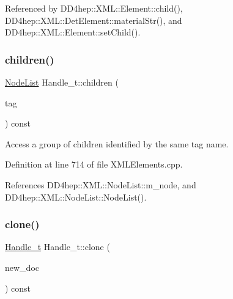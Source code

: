 Referenced by D\+D4hep\+::\+X\+M\+L\+::\+Element\+::child(), D\+D4hep\+::\+X\+M\+L\+::\+Det\+Element\+::material\+Str(), and D\+D4hep\+::\+X\+M\+L\+::\+Element\+::set\+Child().

\hypertarget{class_d_d4hep_1_1_x_m_l_1_1_handle__t_aa27483dcfe272afb4ce560a5e45998f1}{}\label{class_d_d4hep_1_1_x_m_l_1_1_handle__t_aa27483dcfe272afb4ce560a5e45998f1} 
\subsubsection{\texorpdfstring{children()}{children()}}
{\footnotesize\ttfamily \hyperlink{class_d_d4hep_1_1_x_m_l_1_1_node_list}{Node\+List} Handle\+\_\+t\+::children (\begin{DoxyParamCaption}\item[{const \hyperlink{namespace_d_d4hep_1_1_x_m_l_a09e5d9cc86ed782f6826dfe0778c1815}{Xml\+Char} $\ast$}]{tag }\end{DoxyParamCaption}) const}



Access a group of children identified by the same tag name. 



Definition at line 714 of file X\+M\+L\+Elements.\+cpp.



References D\+D4hep\+::\+X\+M\+L\+::\+Node\+List\+::m\+\_\+node, and D\+D4hep\+::\+X\+M\+L\+::\+Node\+List\+::\+Node\+List().

\hypertarget{class_d_d4hep_1_1_x_m_l_1_1_handle__t_a3b0eabdd2c04006c3c4b578eea162661}{}\label{class_d_d4hep_1_1_x_m_l_1_1_handle__t_a3b0eabdd2c04006c3c4b578eea162661} 
\subsubsection{\texorpdfstring{clone()}{clone()}}
{\footnotesize\ttfamily \hyperlink{class_d_d4hep_1_1_x_m_l_1_1_handle__t}{Handle\+\_\+t} Handle\+\_\+t\+::clone (\begin{DoxyParamCaption}\item[{Xml\+Document $\ast$}]{new\+\_\+doc }\end{DoxyParamCaption}) const}



